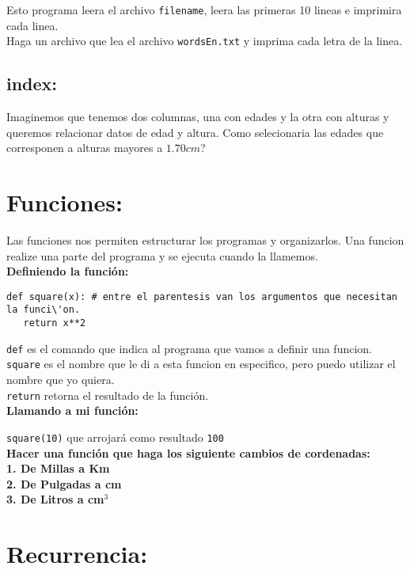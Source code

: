 \documentclass[12pt]{article}
\begin{document}
Esto programa leera el archivo \verb+filename+, leera las primeras 10 lineas
e imprimira cada linea.\\ Haga un archivo que lea el archivo \verb+wordsEn.txt+
y imprima cada letra de la linea.\\
\subsection{index:}

Imaginemos que tenemos dos columnas, una con edades y la otra con alturas y queremos relacionar datos de edad y altura. Como selecionaria las edades que corresponen a alturas mayores a $1.70cm$?

\section{Funciones:}

Las funciones nos permiten estructurar los programas y organizarlos. Una funcion realize una parte 
del programa y se ejecuta cuando la llamemos.\\

{\bf Definiendo la funci\'on:}\\

\begin{verbatim}
def square(x): # entre el parentesis van los argumentos que necesitan la funci\'on.
   return x**2
\end{verbatim}

\verb+def+ es el comando que indica al programa que vamos a definir una funcion.\\
\verb+square+ es el nombre que le di a esta funcion en especifico, pero puedo utilizar el nombre que yo quiera.\\
\verb+return+ retorna el resultado de la funci\'on.\\

{\bf Llamando a mi funci\'on:}

\verb+square(10)+ que arrojar\'a como resultado \verb+100+\\

{\bf{Hacer una funci\'on que haga los siguiente cambios de cordenadas:\\
1. De Millas a Km\\
2. De Pulgadas a cm\\ 
3. De Litros a cm$^{3}$\\}}

\section{Recurrencia:}
\end{document}
